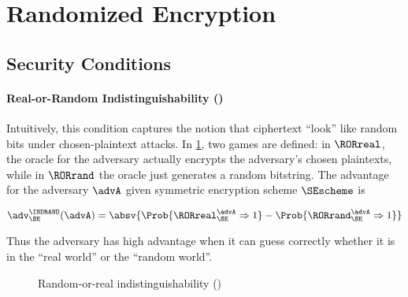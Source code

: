 \section{Randomized Encryption}
\label{sect:randomenc}

\subsection{Security Conditions}

\paragraph{Real-or-Random Indistinguishability (\INDRAND)}

Intuitively, this condition captures the notion that ciphertext ``look'' like
random bits under chosen-plaintext attacks. In \cref{fig:ind-rand}, two
games are defined: in $\RORreal$, the oracle for the adversary actually
encrypts the adversary's chosen plaintexts, while in $\RORrand$ the oracle
just generates a random bitstring. The advantage for the adversary $\advA$ given
symmetric encryption scheme $\SEscheme$ is

$$
\adv_{\SE}^{\INDRAND}(\advA) =
\absv{\Prob{\RORreal_{\SE}^{\advA} \Rightarrow 1} - 
      \Prob{\RORrand_{\SE}^{\advA} \Rightarrow 1}}
$$

Thus the adversary has high advantage when it can guess correctly whether it is
in the ``real world'' or the ``random world''.


\begin{figure}[p]
	\centering
  \caption{Random-or-real indistinguishability (\INDRAND)}
	\label{fig:ind-rand}
\end{figure} 


